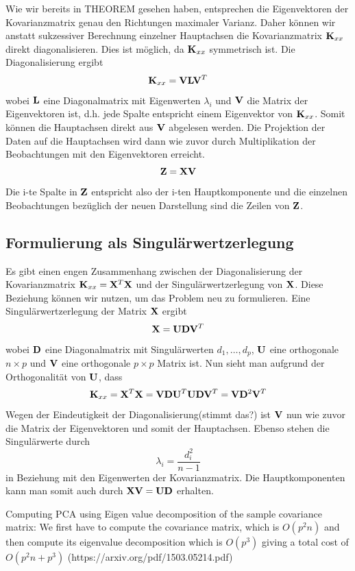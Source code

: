 Wie wir bereits in THEOREM gesehen haben, entsprechen die Eigenvektoren der Kovarianzmatrix genau den Richtungen maximaler Varianz. Daher können wir anstatt sukzessiver Berechnung einzelner Hauptachsen die Kovarianzmatrix $\mathbf{K}_{xx}$ direkt diagonalisieren. Dies ist möglich, da $\mathbf{K}_{xx}$ symmetrisch ist. Die Diagonalisierung ergibt
$$\mathbf{K}_{xx} = \mathbf{V} \mathbf{L} \mathbf{V}^T$$
wobei $\mathbf{L}$ eine Diagonalmatrix mit Eigenwerten $\lambda_i$ und $\mathbf{V}$ die Matrix der Eigenvektoren ist, d.h. jede Spalte entspricht einem Eigenvektor von $\mathbf{K}_{xx}$. Somit können die Hauptachsen direkt aus $\mathbf{V}$ abgelesen werden. Die Projektion der Daten auf die Hauptachsen wird dann wie zuvor durch Multiplikation der Beobachtungen mit den Eigenvektoren erreicht. 
$$\mathbf{Z} = \mathbf{X} \mathbf{V}$$
Die i-te Spalte in $\mathbf{Z}$ entspricht also der i-ten Hauptkomponente und die einzelnen Beobachtungen bezüglich der neuen Darstellung sind die Zeilen von $\mathbf{Z}$.


\subsection{Formulierung als Singulärwertzerlegung}
Es gibt einen engen Zusammenhang zwischen der Diagonalisierung der Kovarianzmatrix $\mathbf{K}_{xx} = \mathbf{X}^T \mathbf{X}$ und der Singulärwertzerlegung von $\mathbf{X}$. Diese Beziehung können wir nutzen, um das Problem neu zu formulieren. Eine Singulärwertzerlegung der Matrix $\mathbf{X}$ ergibt
$$ \mathbf{X} = \mathbf{U}\mathbf{D}\mathbf{V}^T $$
wobei $\mathbf{D}$ eine Diagonalmatrix mit Singulärwerten $d_1,\ldots,d_p$, $\mathbf{U}$ eine orthogonale $n \times p$ und $\mathbf{V}$ eine orthogonale $p \times p$ Matrix ist. Nun sieht man aufgrund der Orthogonalität von $\mathbf{U}$, dass
$$\mathbf{K}_{xx} = \mathbf{X}^T \mathbf{X} = \mathbf{V}\mathbf{D}\mathbf{U}^T \mathbf{U}\mathbf{D}\mathbf{V}^T = \mathbf{V} \mathbf{D}^2 \mathbf{V}^T$$
Wegen der Eindeutigkeit der Diagonalisierung(stimmt das?) ist $\mathbf{V}$ nun wie zuvor die Matrix der Eigenvektoren und somit der Hauptachsen. Ebenso stehen die Singulärwerte durch 
$$\lambda_i = \frac{d_i^2}{n-1}$$
in Beziehung mit den Eigenwerten der Kovarianzmatrix. Die Hauptkomponenten kann man somit auch durch $\mathbf{X} \mathbf{V} = \mathbf{U} \mathbf{D}$ erhalten.

Computing PCA using Eigen value decomposition of the sample covariance matrix:
We first have to compute the covariance matrix, which is $O(p^2n)$ and then compute its eigenvalue decomposition which is $O(p^3)$ giving a total cost of $O(p^2n+p^3)$ (https://arxiv.org/pdf/1503.05214.pdf)

